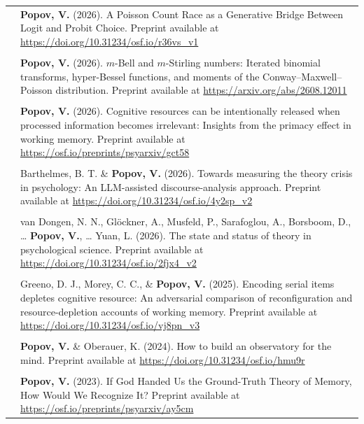 \documentclass[letterpaper]{article}
\begin{document}
\begin{longtable}{p{0.7cm}p{15cm}}
   & \textbf{Popov, V.} (2026). A Poisson Count Race as a Generative Bridge Between Logit and Probit Choice. Preprint available at \url{https://doi.org/10.31234/osf.io/r36vs_v1} \\[6pt]
   & \\
   & \textbf{Popov, V.} (2026). $m$-Bell and $m$-Stirling numbers: Iterated binomial transforms, hyper-Bessel functions, and moments of the Conway--Maxwell--Poisson distribution. Preprint available at \url{https://arxiv.org/abs/2608.12011} \\[6pt]
   & \\
   & \textbf{Popov, V.} (2026). Cognitive resources can be intentionally released when processed information becomes irrelevant: Insights from the primacy effect in working memory. Preprint available at \url{https://osf.io/preprints/psyarxiv/gct58} \\[6pt]
   & \\
   & Barthelmes, B. T. \& \textbf{Popov, V.} (2026). Towards measuring the theory crisis in psychology: An LLM-assisted discourse-analysis approach. Preprint available at \url{https://doi.org/10.31234/osf.io/4y2sp_v2} \\[6pt]
   & \\
   & van Dongen, N. N., Glöckner, A., Musfeld, P., Sarafoglou, A., Borsboom, D., … \textbf{Popov, V.}, … Yuan, L. (2026). The state and status of theory in psychological science. Preprint available at \url{https://doi.org/10.31234/osf.io/2fjx4_v2} \\[6pt]
   & \\
   & Greeno, D. J., Morey, C. C., \& \textbf{Popov, V.} (2025). Encoding serial items depletes cognitive resource: An adversarial comparison of reconfiguration and resource-depletion accounts of working memory. Preprint available at \url{https://doi.org/10.31234/osf.io/vj8pn_v3} \\[6pt]
   & \\
   & \textbf{Popov, V.} \& Oberauer, K. (2024). How to build an observatory for the mind. Preprint available at \url{https://doi.org/10.31234/osf.io/hmu9r} \\[6pt]
   & \\
   & \textbf{Popov, V.} (2023). If God Handed Us the Ground-Truth Theory of Memory, How Would We Recognize It? Preprint available at \url{https://osf.io/preprints/psyarxiv/ay5cm} \\
\end{longtable}
\end{document}
